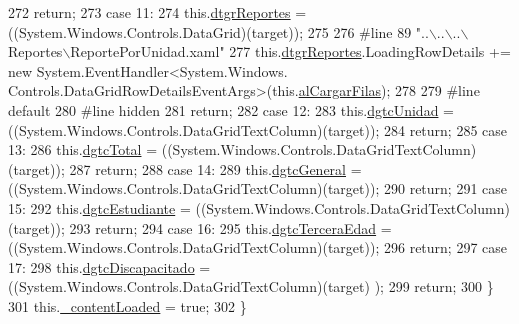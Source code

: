 \begin{DoxyCode}
272             \textcolor{keywordflow}{return};
273             \textcolor{keywordflow}{case} 11:
274             this.\hyperlink{class_proyecto___integrador__3_1_1_reportes_1_1_reporte_por_unidad_ac4501015e077f29cb4a26566d9debe50}{dtgrReportes} = ((System.Windows.Controls.DataGrid)(target));
275             
276 \textcolor{preprocessor}{            #line 89 "..\(\backslash\)..\(\backslash\)..\(\backslash\)Reportes\(\backslash\)ReportePorUnidad.xaml"}
277 \textcolor{preprocessor}{}            this.\hyperlink{class_proyecto___integrador__3_1_1_reportes_1_1_reporte_por_unidad_ac4501015e077f29cb4a26566d9debe50}{dtgrReportes}.LoadingRowDetails += \textcolor{keyword}{new} System.EventHandler<System.Windows.
      Controls.DataGridRowDetailsEventArgs>(this.\hyperlink{class_proyecto___integrador__3_1_1_reportes_1_1_reporte_por_unidad_a6a023ef0a8af7d2b757be59812ab6794}{alCargarFilas});
278             
279 \textcolor{preprocessor}{            #line default}
280 \textcolor{preprocessor}{}\textcolor{preprocessor}{            #line hidden}
281 \textcolor{preprocessor}{}            \textcolor{keywordflow}{return};
282             \textcolor{keywordflow}{case} 12:
283             this.\hyperlink{class_proyecto___integrador__3_1_1_reportes_1_1_reporte_por_unidad_ad4cc063b8f6a657a37503bdb747f45ea}{dgtcUnidad} = ((System.Windows.Controls.DataGridTextColumn)(target));
284             \textcolor{keywordflow}{return};
285             \textcolor{keywordflow}{case} 13:
286             this.\hyperlink{class_proyecto___integrador__3_1_1_reportes_1_1_reporte_por_unidad_abcccd0f8af50c0d2a94f8ec2030b237f}{dgtcTotal} = ((System.Windows.Controls.DataGridTextColumn)(target));
287             \textcolor{keywordflow}{return};
288             \textcolor{keywordflow}{case} 14:
289             this.\hyperlink{class_proyecto___integrador__3_1_1_reportes_1_1_reporte_por_unidad_a0f1d6ffbdedd1cb3d884f4a9468e6da4}{dgtcGeneral} = ((System.Windows.Controls.DataGridTextColumn)(target));
290             \textcolor{keywordflow}{return};
291             \textcolor{keywordflow}{case} 15:
292             this.\hyperlink{class_proyecto___integrador__3_1_1_reportes_1_1_reporte_por_unidad_a544a15cf1c63259da29da75d20618a1d}{dgtcEstudiante} = ((System.Windows.Controls.DataGridTextColumn)(target));
293             \textcolor{keywordflow}{return};
294             \textcolor{keywordflow}{case} 16:
295             this.\hyperlink{class_proyecto___integrador__3_1_1_reportes_1_1_reporte_por_unidad_a717db9d78e9f0644d009266a9b3bb345}{dgtcTerceraEdad} = ((System.Windows.Controls.DataGridTextColumn)(target));
296             \textcolor{keywordflow}{return};
297             \textcolor{keywordflow}{case} 17:
298             this.\hyperlink{class_proyecto___integrador__3_1_1_reportes_1_1_reporte_por_unidad_a3ed4719c9c58f9d5ad88eb0d5c700898}{dgtcDiscapacitado} = ((System.Windows.Controls.DataGridTextColumn)(target)
      );
299             \textcolor{keywordflow}{return};
300             \}
301             this.\hyperlink{class_proyecto___integrador__3_1_1_reportes_1_1_reporte_por_unidad_afd92a2e129c768f1cf763c22165393d6}{\_contentLoaded} = \textcolor{keyword}{true};
302         \}
\end{DoxyCode}
